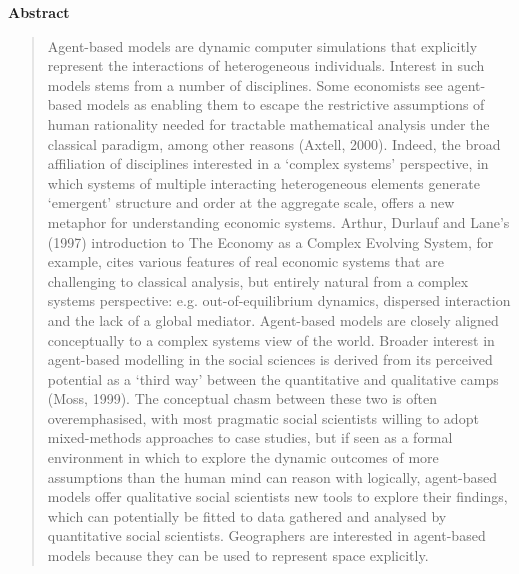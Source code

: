 \vspace{1.5em}
\noindent\textbf{Abstract}\par
\begin{quote}\small
Agent-based models are dynamic computer simulations that explicitly represent the interactions of heterogeneous individuals. Interest in such models stems from a number of disciplines. Some economists see agent-based models as enabling them to escape the restrictive assumptions of human rationality needed for tractable mathematical analysis under the classical paradigm, among other reasons (Axtell, 2000). Indeed, the broad affiliation of disciplines interested in a ‘complex systems’ perspective, in which systems of multiple interacting heterogeneous elements generate ‘emergent’ structure and order at the aggregate scale, offers a new metaphor for understanding economic systems. Arthur, Durlauf and Lane’s (1997) introduction to The Economy as a Complex Evolving System, for example, cites various features of real economic systems that are challenging to classical analysis, but entirely natural from a complex systems perspective: e.g. out-of-equilibrium dynamics, dispersed interaction and the lack of a global mediator. Agent-based models are closely aligned conceptually to a complex systems view of the world. Broader interest in agent-based modelling in the social sciences is derived from its perceived potential as a ‘third way’ between the quantitative and qualitative camps (Moss, 1999). The conceptual chasm between these two is often overemphasised, with most pragmatic social scientists willing to adopt mixed-methods approaches to case studies, but if seen as a formal environment in which to explore the dynamic outcomes of more assumptions than the human mind can reason with logically, agent-based models offer qualitative social scientists new tools to explore their findings, which can potentially be fitted to data gathered and analysed by quantitative social scientists. Geographers are interested in agent-based models because they can be used to represent space explicitly.
\end{quote}

